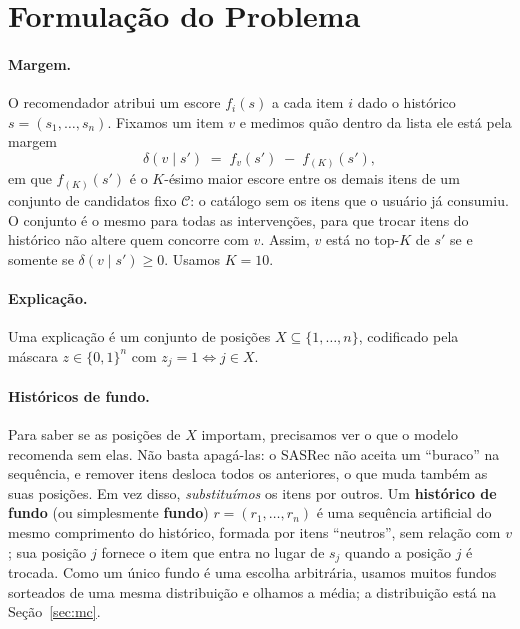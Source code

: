 \section{Formulação do Problema}
\label{sec:formulacao}

\paragraph{Margem.}
O recomendador atribui um escore $f_i(s)$ a cada item $i$ dado o histórico
$s=(s_1,\dots,s_n)$. Fixamos um item $v$ e medimos quão dentro da lista ele
está pela margem
\begin{equation}
  \delta(v \mid s') \;=\; f_v(s') \;-\; f_{(K)}(s'),
  \label{eq:margem}
\end{equation}
em que $f_{(K)}(s')$ é o $K$-ésimo maior escore entre os demais itens de um
conjunto de candidatos fixo $\mathcal{C}$: o catálogo sem os itens que o
usuário já consumiu. O conjunto é o mesmo para todas as intervenções, para que
trocar itens do histórico não altere quem concorre com $v$. Assim,
$v$ está no top-$K$ de $s'$ se e somente se $\delta(v \mid s') \ge 0$. Usamos
$K=10$.

\paragraph{Explicação.}
Uma explicação é um conjunto de posições $X \subseteq \{1,\dots,n\}$,
codificado pela máscara $z \in \{0,1\}^n$ com $z_j = 1 \iff j \in X$.

\paragraph{Históricos de fundo.}
Para saber se as posições de $X$ importam, precisamos ver o que o modelo
recomenda sem elas. Não basta apagá-las: o SASRec não aceita um ``buraco'' na
sequência, e remover itens desloca todos os anteriores, o que muda também as
suas posições. Em vez disso, \emph{substituímos} os itens por outros. Um
\textbf{histórico de fundo} (ou simplesmente \textbf{fundo}) $r=(r_1,\dots,r_n)$
é uma sequência artificial do mesmo comprimento do histórico, formada por itens
``neutros'', sem relação com $v$; sua posição $j$ fornece o item que entra no
lugar de $s_j$ quando a posição $j$ é trocada. Como um único fundo é uma
escolha arbitrária, usamos muitos fundos sorteados de uma mesma distribuição e
olhamos a média; a distribuição está na Seção~\ref{sec:mc}.

